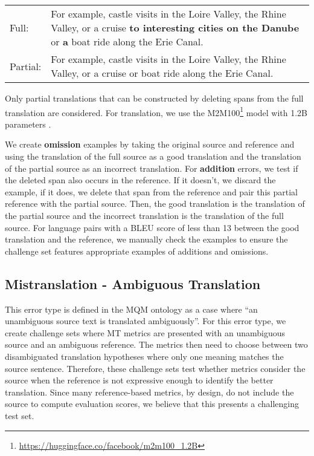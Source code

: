 \documentclass[11pt]{article}
\begin{document}
\begin{small}
\vspace{0.5cm}
\setlength{\extrarowheight}{0.1cm}
\begin{tabularx}{0.95\columnwidth}{lX}
     Full: & For example, castle visits in the Loire Valley, the Rhine Valley, or a cruise \textbf{to interesting cities on the Danube} or \textbf{a} boat ride along the Erie Canal. \\
     Partial: & For example, castle visits in the Loire Valley, the Rhine Valley, or a cruise or boat ride along the Erie Canal. \vspace{0.35cm}
\end{tabularx}
\end{small}

Only partial translations that can be constructed by deleting spans from the full translation are considered. For translation, we use the M2M100\footnote{\url{https://huggingface.co/facebook/m2m100_1.2B}} model with 1.2B parameters \citep{fan2021beyond}.

We create \textbf{omission} examples by taking the original source and reference and using the translation of the full source as a good translation and the translation of the partial source as an incorrect translation. For \textbf{addition} errors, we test if the deleted span also occurs in the reference. If it doesn't, we discard the example, if it does, we delete that span from the reference and pair this partial reference with the partial source. Then, the good translation is the translation of the partial source and the incorrect translation is the translation of the full source. 
For language pairs with a BLEU score of less than 13 between the good translation and the reference, we manually check the examples to ensure the challenge set features appropriate examples of additions and omissions.

\subsection{Mistranslation - Ambiguous Translation}
\label{sec:source-disambig}
This error type is defined in the MQM ontology as a case where ``an unambiguous source text is translated ambiguously''. For this error type, we create challenge sets where MT metrics are presented with an unambiguous source and an ambiguous reference. The metrics then need to choose between two disambiguated translation hypotheses where only one meaning matches the source sentence. Therefore, these challenge sets test whether metrics consider the source when the reference is not expressive enough to identify the better translation. Since many reference-based metrics, by design, do not include the source to compute evaluation scores, we believe that this presents a challenging test set.
\end{document}
